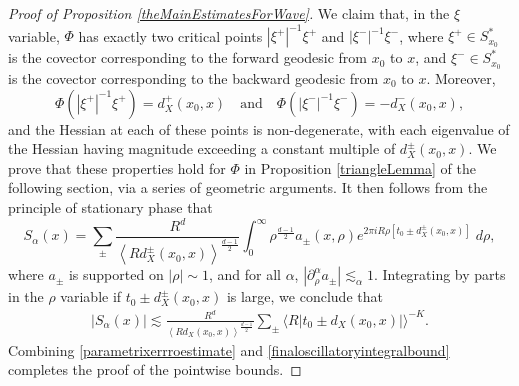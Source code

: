\begin{proof}[Proof of Proposition \ref{theMainEstimatesForWave}]
%
%
%
We claim that, in the $\xi$ variable, $\Phi$ has exactly two critical points $|\xi^+|^{-1} \xi^+$ and $|\xi^-|^{-1} \xi^-$, where $\xi^+ \in S_{x_0}^*$ is the covector corresponding to the forward geodesic from $x_0$ to $x$, and $\xi^- \in S_{x_0}^*$ is the covector corresponding to the backward geodesic from $x_0$ to $x$. Moreover,
%
\begin{equation}
    \Phi(|\xi^+|^{-1} \xi^+) = d_X^+(x_0,x) \quad\text{and}\quad \Phi(|\xi^-|^{-1} \xi^-) = - d_X^-(x_0,x),
\end{equation}
%
and the Hessian at each of these points is non-degenerate, with each eigenvalue of the Hessian having magnitude exceeding a constant multiple of $d_X^{\pm}(x_0,x)$. We prove that these properties hold for $\Phi$ in Proposition \ref{triangleLemma} of the following section, via a series of geometric arguments. It then follows from the principle of stationary phase that
%
\begin{equation}
    S_\alpha(x) = \sum_{\pm} \frac{R^{d}}{\left\langle R d_X^{\pm}(x_0,x) \right\rangle^{\frac{d-1}{2}}} \int_0^\infty \rho^{\frac{d-1}{2}} a_{\pm}(x,\rho) e^{2 \pi i R \rho [ t_0 \pm d_X^{\pm}(x_0,x)]}\; d\rho,
\end{equation}
%
where $a_{\pm}$ is supported on $|\rho| \sim 1$, and for all $\alpha$, $|\partial_\rho^\alpha a_{\pm}| \lesssim_\alpha 1$. Integrating by parts in the $\rho$ variable if $t_0 \pm d_X^{\pm}(x_0,x)$ is large, we conclude that
%
%
% 
% 
%
\begin{equation} \label{finaloscillatoryintegralbound}
\begin{split}
    |S_\alpha(x)| \lesssim \frac{R^{d}}{\left\langle R d_X(x_0,x) \right\rangle^{\frac{d-1}{2}}} \sum_{\pm} \big\langle R |t_0 \pm d_X(x_0,x)| \big\rangle^{-K}.
\end{split}
\end{equation}
%
Combining \eqref{parametrixerrroestimate} and \eqref{finaloscillatoryintegralbound} completes the proof of the pointwise bounds.


\end{proof}
